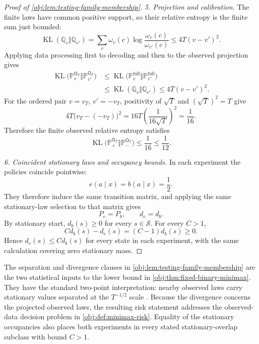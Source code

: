 \documentclass[11pt]{article}
\begin{document}
\begin{proof}[Proof of \cref{obj:lem:testing-family-membership}]
\emph{5. Projection and calibration.}
The finite laws have common positive support, so their relative entropy is the finite sum just bounded:
\[
\operatorname{KL}(\mathbb Q_v\Vert\mathbb Q_{v'})
=\sum_c\omega_v(c)\log\frac{\omega_v(c)}{\omega_{v'}(c)}
\leq4T(v-v')^2.
\]
Applying data processing first to decoding and then to the observed projection gives
\[
\begin{aligned}
\operatorname{KL}
 \bigl(\mathbb P_v^{\mathsf O_T}\Vert
       \mathbb P_{v'}^{\mathsf O_T}\bigr)
&\leq
\operatorname{KL}
 \bigl(\mathbb P_v^{\mathrm{full}}\Vert
       \mathbb P_{v'}^{\mathrm{full}}\bigr)\\
&\leq\operatorname{KL}(\mathbb Q_v\Vert\mathbb Q_{v'})
\leq4T(v-v')^2.
\end{aligned}
\]
For the ordered pair \(v=v_T\), \(v'=-v_T\), positivity of \(\sqrt T\) and
\((\sqrt T)^2=T\) give
\[
4T\bigl(v_T-(-v_T)\bigr)^2
=16T\left(\frac1{16\sqrt T}\right)^2
=\frac1{16}.
\]
Therefore the finite observed relative entropy satisfies
\[
\operatorname{KL}
 \bigl(\mathbb P_+^{\mathsf O_T}\Vert
       \mathbb P_-^{\mathsf O_T}\bigr)
\leq\frac1{16}\leq\frac1{12}.
\]

\emph{6. Coincident stationary laws and occupancy bounds.}
In each experiment the policies coincide pointwise:
\[
e(a\mid x)=b(a\mid x)=\frac12.
\]
They therefore induce the same transition matrix, and applying the same stationary-law selection to that matrix gives
\[
P_e=P_b,\qquad d_e=d_b.
\]
By stationary start, \(d_b(s)\geq0\) for every \(s\in\mathcal S\). For every \(C>1\),
\[
Cd_b(s)-d_e(s)=(C-1)d_b(s)\geq0.
\]
Hence \(d_e(s)\leq Cd_b(s)\) for every state in each experiment, with the same calculation covering zero stationary mass.
\end{proof}

The separation and divergence clauses in \cref{obj:lem:testing-family-membership} are the two statistical inputs to the lower bound in \cref{obj:thm:fixed-binary-minimax}. They have the standard two-point interpretation: nearby observed laws carry stationary values separated at the \(T^{-1/2}\) scale \citep[Section 2.2]{Tsybakov2009}. Because the divergence concerns the projected observed laws, the resulting risk statement addresses the observed-data decision problem in \cref{obj:def:minimax-risk}. Equality of the stationary occupancies also places both experiments in every stated stationary-overlap subclass with bound \(C>1\).
\end{document}
